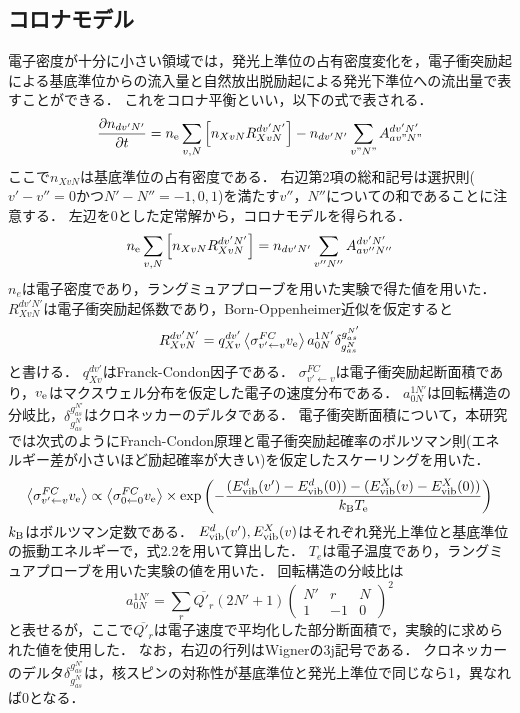 \subsection{コロナモデル}
電子密度が十分に小さい領域では，発光上準位の占有密度変化を，電子衝突励起による基底準位からの流入量と自然放出脱励起による発光下準位への流出量で表すことができる．
これをコロナ平衡といい，以下の式で表される\cite{PRnoijousei}．
\begin{equation}
    \frac{\partial n_{dv'N'}}{\partial t} = n_{\rm e} \sum_{v, N} \left[ n_{XvN} R^{dv'N'}_{XvN} \right] - n_{dv'N'} \sum_{v"N"} A^{dv'N'}_{av"N"}
\end{equation}
ここで$n_{XvN}$は基底準位の占有密度である．
右辺第2項の総和記号は選択則($v'-v''=0$かつ$N'-N''=-1,0,1$)を満たす$v''，N''$についての和であることに注意する．
左辺を0とした定常解から，コロナモデルを得られる．
\begin{equation}
    n_{\rm e} \sum_{v, N} \left[ n_{XvN} R^{dv'N'}_{XvN} \right] = n_{dv'N'} \sum_{v''N''} A^{dv'N'}_{av''N''}
\end{equation}
$n_e$は電子密度であり，ラングミュアプローブを用いた実験で得た値を用いた\cite{yun}．
$R^{dv'N'}_{XvN}$は電子衝突励起係数であり，Born-Oppenheimer近似を仮定すると
\begin{equation}
    R^{dv'N'}_{XvN} = q^{dv'}_{Xv} \left< \sigma^{FC}_{v' \leftarrow v} v_{\rm e} \right> a^{1N'}_{0N} \delta^{g^{N'}_{as}}_{g^N_{as}}
\end{equation}
と書ける\cite{PRnoijousei}．
$q^{dv'}_{Xv}$はFranck-Condon因子である．
$\sigma^{FC}_{v' \leftarrow v}$は電子衝突励起断面積であり，$v_{\rm e}$はマクスウェル分布を仮定した電子の速度分布である．
$a^{1N'}_{0N}$は回転構造の分岐比，$\delta^{g^{N'}_{as}}_{g^N_{as}}$はクロネッカーのデルタである．
電子衝突断面積について，本研究では次式のようにFranch-Condon原理と電子衝突励起確率のボルツマン則(エネルギー差が小さいほど励起確率が大きい)を仮定したスケーリングを用いた\cite{kyokaisou}．
\begin{equation}
    \left< \sigma^{FC}_{v' \leftarrow v} v_{\rm e} \right> \propto \left< \sigma^{FC}_{0 \leftarrow 0} v_{\rm e} \right> \times \exp \left( -\frac{(E^d_{\rm vib} (v') - E^d_{\rm vib} (0))-(E^X_{\rm vib} (v) - E^X_{\rm vib} (0))}{k_{\rm B} T_{\rm e}} \right)
\end{equation}
$k_{\rm B}$はボルツマン定数である．
$E^d_{\rm vib} (v'), E^X_{\rm vib} (v)$はそれぞれ発光上準位と基底準位の振動エネルギーで，式2.2を用いて算出した．
$T_{e}$は電子温度であり，ラングミュアプローブを用いた実験の値を用いた\cite{yun}．
回転構造の分岐比は
\begin{equation}
    a^{1N'}_{0N} = \sum_r \overline{Q'_{r}} (2N'+1) \left( \begin{array}{ccc} N' & r & N \\ 1 & -1 & 0 \end{array} \right)^2
\end{equation}
と表せるが，ここで$\overline{Q'_{r}}$は電子速度で平均化した部分断面積で，実験的に求められた値を使用した\cite{senkusya}．
なお，右辺の行列はWignerの3j記号である．
クロネッカーのデルタ$\delta^{g^{N'}_{as}}_{g^N_{as}}$は，核スピンの対称性が基底準位と発光上準位で同じなら1，異なれば0となる．

